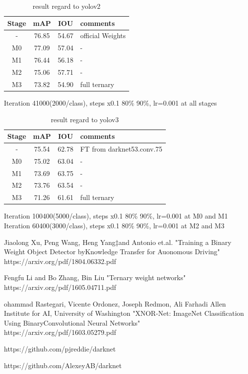 \documentclass[twocolumn]{article}
\begin{document}
\begin{table}[htbp]
 \centering
 \begin{tabular}{c|c|c|l}
  Stage & mAP & IOU & comments \\ \hline\hline
  -        & 76.85 & 54.67 & official Weights \\ \hline
  M0       & 77.09 & 57.04 & -                \\ \hline
  M1       & 76.44 & 56.18 & -                \\ \hline
  M2       & 75.06 & 57.71 & -                \\ \hline
  M3       & 73.82 & 54.90 & full ternary     \\ \hline\hline
 \end{tabular}
 \caption{result regard to yolov2}
 \label{tb:yolov2}
\end{table}

Iteration 41000(2000/class), steps x0.1 80\% 90\%, lr=0.001 at all stages

\begin{table}[htbp]
 \centering
 \begin{tabular}{c|c|c|l}
  Stage & mAP & IOU & comments \\ \hline\hline
  -        & 75.54 & 62.78 & FT from darknet53.conv.75 \\ \hline
  M0       & 75.02 & 63.04 & -                \\ \hline
  M1       & 73.69 & 63.75 & -                \\ \hline
  M2       & 73.76 & 63.54 & -                \\ \hline
  M3       & 71.26 & 61.61 & full ternary     \\ \hline\hline
 \end{tabular}
 \caption{result regard to yolov3}
 \label{tb:yolov3}
\end{table}

Iteration 100400(5000/class), steps x0.1 80\% 90\%, lr=0.001 at M0 and M1
Iteration 60400(3000/class), steps x0.1 80\% 90\%, lr=0.001 at M2 and M3

\begin{thebibliography}{99}
 \item Jiaolong Xu, Peng Wang, Heng Yang‡and Antonio et.al.
 "Training a Binary Weight Object Detector byKnowledge Transfer for Auonomous Driving" https://arxiv.org/pdf/1804.06332.pdf
 \item Fengfu Li and Bo Zhang, Bin Liu "Ternary weight networks" https://arxiv.org/pdf/1605.04711.pdf
 \item ohammad Rastegari, Vicente Ordonez, Joseph Redmon, Ali Farhadi Allen Institute for AI, University of Washington
 "XNOR-Net: ImageNet Classification Using BinaryConvolutional Neural Networks" https://arxiv.org/pdf/1603.05279.pdf
 \item https://github.com/pjreddie/darknet
 \item https://github.com/AlexeyAB/darknet

\end{thebibliography}
\end{document}
